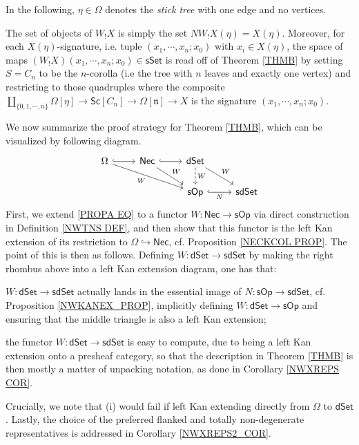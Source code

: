 \documentclass{hha}
\theoremstyle{definition} %
\newcommand{\sOp}{\mathsf{sOp}}
\newcommand{\dSet}{\mathsf{dSet}}
\begin{document}
In the following, $\eta \in \Omega$
denotes the \emph{stick tree} with one edge and no vertices.

\begin{remark}\label{READMAPSP REM}
	The set of objects of $W_! X$ is simply the set
	$NW_! X(\eta) = X(\eta)$.
	Moreover, for each $X(\eta)$-signature, 
	i.e. tuple $(x_1,\cdots,x_n;x_0)$ with $x_i \in X(\eta)$,
	the space of maps
	$(W_! X)(x_1,\cdots,x_n;x_0) \in \mathsf{sSet}$
	is read off of Theorem \ref{THMB}
	by setting $S=C_n$ to be the $n$-corolla
	(i.e the tree with $n$ leaves and exactly one vertex)
	and restricting to those quadruples where the composite
	$\coprod_{\{0,1,\cdots,n\}}\Omega[\eta] 
	\to \mathsf{Sc}[C_n] \to 
	\Omega[\mathfrak{n}] \to X$
	is the signature $(x_1,\cdots,x_n;x_0)$.
\end{remark}



We now summarize the proof strategy for Theorem \ref{THMB},
which can be visualized by following diagram.
\begin{equation}\label{KEYSTRAT EQ}
\begin{tikzcd}
\Omega \ar[hookrightarrow]{r}
\ar{rrd}[swap]{W} 
&
\mathsf{Nec}
\ar[hookrightarrow]{r}
\ar{rd}{W}
&
\mathsf{dSet} \ar{rd}{W}
\ar[dashed]{d}{W}
\\
&&
\mathsf{sOp} \ar[hookrightarrow]{r}[swap]{N} &
\mathsf{sdSet}
\end{tikzcd}
\end{equation}
First, 
we extend \eqref{PROPA EQ} to a functor
$W \colon \mathsf{Nec} \to \sOp$
via direct construction
in Definition \ref{NWTNS DEF},
and then show that this functor is the left Kan extension of 
its restriction to 
$\Omega \hookrightarrow \mathsf{Nec}$,
cf. Proposition \ref{NECKCOL PROP}.
The point of this is then as follows.
Defining $W \colon \mathsf{dSet} \to \mathsf{sdSet}$
by making the right rhombus above into a left Kan extension diagram,
one has that:
\begin{enumerate*}
\item
$W \colon \mathsf{dSet} \to \mathsf{sdSet}$
actually lands in the essential image
of $N \colon \sOp \to \mathsf{sdSet}$,
cf. Proposition \ref{NWKANEX_PROP},
implicitly defining 
$W \colon \mathsf{dSet} \to \sOp$
and ensuring that the middle triangle is also a left Kan extension;
\item
the functor 
$W \colon \mathsf{dSet} \to \mathsf{sdSet}$
is easy to compute, due to being a left Kan extension onto a presheaf category,
so that the description in Theorem \ref{THMB}
is then mostly a matter of unpacking notation,
as done in Corollary \ref{NWXREPS COR}.
\end{enumerate*}
Crucially, we note that (i) would fail
if left Kan extending directly from 
$\Omega$ to $\dSet$. 
Lastly, the choice of the preferred 
flanked and totally non-degenerate 
representatives is addressed in 
Corollary \ref{NWXREPS2_COR}.
\end{document}
